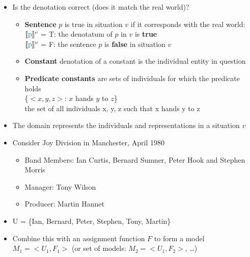 \documentclass[headrule,footrule]{foils}
\newcommand{\den}[2][]{\ensuremath{\llbracket\textnormal{\textcolor{teal}{#2}}\rrbracket^{\ensuremath{#1}}}}
\begin{document}

\begin{itemize}
\item Is the denotation correct (does it match the real world)?
  \begin{itemize}
  \item \textbf{Sentence} 
    $p$ is true in situation $v$ if it corresponds with the real world: 
    \\ {\den[v]{p} = T}: the denotatum of $p$ in $v$ is \textbf{true}
    \\ {\den[v]{p} = F}: the sentence $p$ is \textbf{false} in situation $v$
  \item \textbf{Constant} denotation of a constant is the individual entity in question
  \item \textbf{Predicate constants} are sets of individuals for which the predicate holds
\\ {\{$<x, y, z>$: $x$ hands $y$ to $z$\}}
\\ the set of all individuals x, y, z such that x hands y to z
  \end{itemize}

\end{itemize}





\begin{itemize}
\item The domain represents the individuals and representations in a situation $v$
\item Consider Joy Division in Manchester, April 1980
  \begin{itemize}
  \item Band Members: Ian Curtis, Bernard Sumner, Peter Hook and Stephen Morris 
  \item Manager: Tony Wilson
  \item Producer: Martin Hannet
  \end{itemize}
\item U = \{Ian, Bernard, Peter, Stephen, Tony, Martin\}
\item Combine this with an assignment function $F$ to form a model
\\ $M_1 = <U_1, F_1>$ (or set of models: $M_2 = <U_1, F_2>$, \ldots)
\end{itemize}
\end{document}
